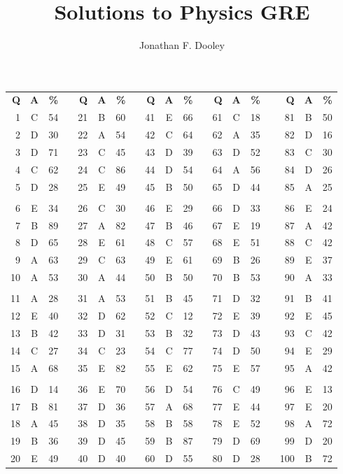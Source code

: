 \documentclass[12pt]{article}
\title{Solutions to \Year Physics GRE}
\author{Jonathan F. Dooley}
\newcommand{\Year}{2001}
\newcommand{\Ident}{GR0177}
\newcommand{\Version}{2.0}
\begin{document}
\TitlePage{\Year}{\Ident}{\Version}

\begin{table}
\centering
\begin{tabular}{rcrc rcrc rcrc rcrc rcc}
\textbf{Q} & \textbf{A} & \textbf{\%} &&
\textbf{Q} & \textbf{A} & \textbf{\%} &&
\textbf{Q} & \textbf{A} & \textbf{\%} &&
\textbf{Q} & \textbf{A} & \textbf{\%} &&
\textbf{Q} & \textbf{A} & \textbf{\%} \\
1  & C & 54 && 21 & B & 60 && 41 & E & 66 && 61 & C & 18 && 81  & B & 50  \\
2  & D & 30 && 22 & A & 54 && 42 & C & 64 && 62 & A & 35 && 82  & D & 16  \\
3  & D & 71 && 23 & C & 45 && 43 & D & 39 && 63 & D & 52 && 83  & C & 30  \\
4  & C & 62 && 24 & C & 86 && 44 & D & 54 && 64 & A & 56 && 84  & D & 26  \\
5  & D & 28 && 25 & E & 49 && 45 & B & 50 && 65 & D & 44 && 85  & A & 25  \\
   &   &    &&    &   &    &&    &   &    &&    &   &    &&     &   &     \\
6  & E & 34 && 26 & C & 30 && 46 & E & 29 && 66 & D & 33 && 86  & E & 24  \\
7  & B & 89 && 27 & A & 82 && 47 & B & 46 && 67 & E & 19 && 87  & A & 42  \\
8  & D & 65 && 28 & E & 61 && 48 & C & 57 && 68 & E & 51 && 88  & C & 42  \\
9  & A & 63 && 29 & C & 63 && 49 & E & 61 && 69 & B & 26 && 89  & E & 37  \\
10 & A & 53 && 30 & A & 44 && 50 & B & 50 && 70 & B & 53 && 90  & A & 33  \\
   &   &    &&    &   &    &&    &   &    &&    &   &    &&     &   &     \\
11 & A & 28 && 31 & A & 53 && 51 & B & 45 && 71 & D & 32 && 91  & B & 41  \\
12 & E & 40 && 32 & D & 62 && 52 & C & 12 && 72 & E & 39 && 92  & E & 45  \\
13 & B & 42 && 33 & D & 31 && 53 & B & 32 && 73 & D & 43 && 93  & C & 42  \\
14 & C & 27 && 34 & C & 23 && 54 & C & 77 && 74 & D & 50 && 94  & E & 29  \\
15 & A & 68 && 35 & E & 82 && 55 & E & 62 && 75 & E & 57 && 95  & A & 42  \\
   &   &    &&    &   &    &&    &   &    &&    &   &    &&     &   &     \\
16 & D & 14 && 36 & E & 70 && 56 & D & 54 && 76 & C & 49 && 96  & E & 13  \\
17 & B & 81 && 37 & D & 36 && 57 & A & 68 && 77 & E & 44 && 97  & E & 20  \\
18 & A & 45 && 38 & D & 35 && 58 & B & 58 && 78 & E & 52 && 98  & A & 72  \\
19 & B & 36 && 39 & D & 45 && 59 & B & 87 && 79 & D & 69 && 99  & D & 20  \\
20 & E & 49 && 40 & D & 40 && 60 & D & 55 && 80 & D & 28 && 100 & B & 72
\end{tabular}
\end{table}
\end{document}

